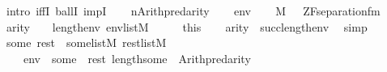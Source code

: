 \begin{isabellebody}
\ {\isacharparenleft}{\kern0pt}intro\ iffI\ ballI\ impI{\isacharparenright}{\kern0pt}\isanewline
\ \ \isamarkupfalse%
\ {\isacharquery}{\kern0pt}n{\isacharequal}{\kern0pt}{\isachardoublequoteopen}Arith{\isachardot}{\kern0pt}pred{\isacharparenleft}{\kern0pt}arity{\isacharparenleft}{\kern0pt}{\isasymphi}{\isacharparenright}{\kern0pt}{\isacharparenright}{\kern0pt}{\isachardoublequoteclose}\isanewline
\ \ \isamarkupfalse%
\ env\isanewline
\ \ \isamarkupfalse%
\ {\isachardoublequoteopen}M{\isacharcomma}{\kern0pt}\ {\isacharbrackleft}{\kern0pt}{\isacharbrackright}{\kern0pt}\ {\isasymTurnstile}\ ZF{\isacharunderscore}{\kern0pt}separation{\isacharunderscore}{\kern0pt}fm{\isacharparenleft}{\kern0pt}{\isasymphi}{\isacharparenright}{\kern0pt}{\isachardoublequoteclose}\ \isanewline
\ \ \isamarkupfalse%
\ {\isachardoublequoteopen}arity{\isacharparenleft}{\kern0pt}{\isasymphi}{\isacharparenright}{\kern0pt}\ {\isasymle}\ {}\ {\isacharhash}{\kern0pt}{\isacharplus}{\kern0pt}\ length{\isacharparenleft}{\kern0pt}env{\isacharparenright}{\kern0pt}{\isachardoublequoteclose}\ {\isachardoublequoteopen}env{\isasymin}list{\isacharparenleft}{\kern0pt}M{\isacharparenright}{\kern0pt}{\isachardoublequoteclose}\isanewline
\ \ \isamarkupfalse%
\ \isamarkupfalse%
\ this\isanewline
\ \ \isamarkupfalse%
\ {\isachardoublequoteopen}arity{\isacharparenleft}{\kern0pt}{\isasymphi}{\isacharparenright}{\kern0pt}\ {\isasymle}\ succ{\isacharparenleft}{\kern0pt}length{\isacharparenleft}{\kern0pt}env{\isacharparenright}{\kern0pt}{\isacharparenright}{\kern0pt}{\isachardoublequoteclose}\ \isamarkupfalse%
\ simp\isanewline
\ \ \isamarkupfalse%
\isanewline
\ \ \isamarkupfalse%
\ some\ rest\ \ {\isachardoublequoteopen}some{\isasymin}list{\isacharparenleft}{\kern0pt}M{\isacharparenright}{\kern0pt}{\isachardoublequoteclose}\ {\isachardoublequoteopen}rest{\isasymin}list{\isacharparenleft}{\kern0pt}M{\isacharparenright}{\kern0pt}{\isachardoublequoteclose}\ \isanewline
\ \ \ \ {\isachardoublequoteopen}env\ {\isacharequal}{\kern0pt}\ some\ {\isacharat}{\kern0pt}\ rest{\isachardoublequoteclose}\ {\isachardoublequoteopen}length{\isacharparenleft}{\kern0pt}some{\isacharparenright}{\kern0pt}\ {\isacharequal}{\kern0pt}\ Arith{\isachardot}{\kern0pt}pred{\isacharparenleft}{\kern0pt}arity{\isacharparenleft}{\kern0pt}{\isasymphi}{\isacharparenright}{\kern0pt}{\isacharparenright}{\kern0pt}{\isachardoublequoteclose}\isanewline

\end{isabellebody}
